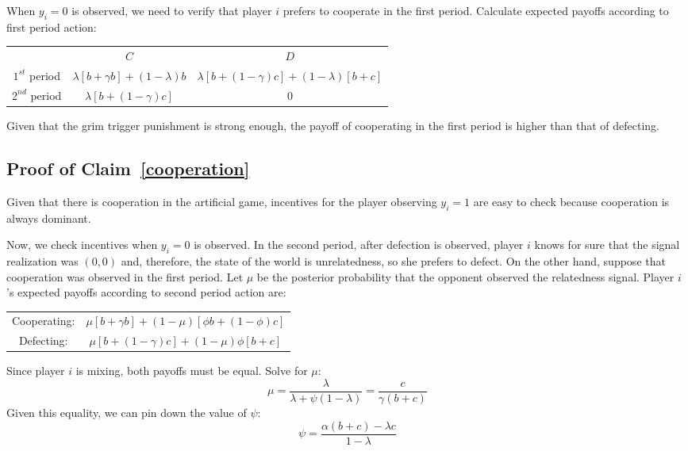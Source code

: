 \documentclass[12pt]{article}
\begin{document}
When $y_{i}=0$ is observed, we need to verify that player $i$ prefers to cooperate in the first period. Calculate expected payoffs according to first period action:

\begin{center}
\begin{tabular}{cc|c}
     & $C$ & $D$ \\
    \cline{2-3}
    \small{$1^{st}$ period} & $\lambda[b+\gamma b]+(1-\lambda)b$ & $\lambda[b+(1-\gamma)c]+(1-\lambda)[b+c]$ \\
    \small{$2^{nd}$ period} & $\lambda[b+(1-\gamma) c]$ & $0$ \\ 
\end{tabular}
\end{center}

Given that the grim trigger punishment is strong enough, the payoff of cooperating in the first period is higher than that of defecting.


\subsection{Proof of Claim~\ref{cooperation}}

Given that there is cooperation in the artificial game, incentives for the player observing $y_{i}=1$ are easy to check because cooperation is always dominant.

Now, we check incentives when $y_{i}=0$ is observed. In the second period, after defection is observed, player $i$ knows for sure that the signal realization was $(0,0)$ and, therefore, the state of the world is unrelatedness, so she prefers to defect. On the other hand, suppose that cooperation was observed in the first period. Let $\mu$ be the posterior probability that the opponent observed the relatedness signal. Player $i$'s expected payoffs according to second period action are: 

\begin{center}
\begin{tabular}{cc}
    Cooperating: & $\mu[b+\gamma b]+(1-\mu)[\phi b+(1-\phi)c]$\\
    Defecting: & $\mu[b+(1-\gamma)c]+(1-\mu)\phi[b+c]$ \\
\end{tabular}
\end{center}
\bigskip
Since player $i$ is mixing, both payoffs must be equal. Solve for $\mu$:
\begin{equation}
\mu = \frac{\lambda}{\lambda + \psi(1-\lambda)} = \frac{c}{\gamma (b+c)}
\end{equation}
Given this equality, we can pin down the value of $\psi$:
\begin{equation}
\psi = \frac{\alpha(b+c)-\lambda c}{1-\lambda}
\end{equation}
\end{document}
